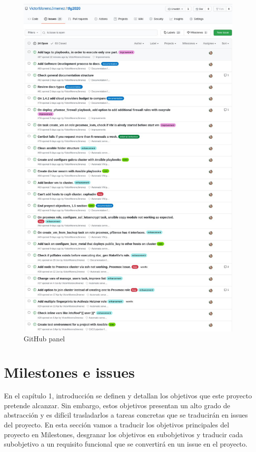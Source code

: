 \begin{text}
	
	\begin{figure}[!hbt]
		\centering
		\includegraphics[scale=0.46]{imagenes/Analisis/githubissues.jpg}
		\caption[GitHub panel]{GitHub panel}
		\label{github_issues}
	\end{figure}
\end{text}
\clearpage

\section{Milestones e issues}
\begin{text}
	En el capítulo 1, introducción se definen y detallan los objetivos que este proyecto pretende alcanzar. Sin embargo, estos objetivos presentan un alto grado de abstracción y es difícil trasladarlos a tareas concretas que se traducirán en issues del proyecto. En esta sección vamos a traducir los objetivos principales del proyecto en Milestones, desgranar los objetivos en subobjetivos y traducir cada subobjetivo a un requisito funcional que se convertirá en un issue en el proyecto.
\end{text}


